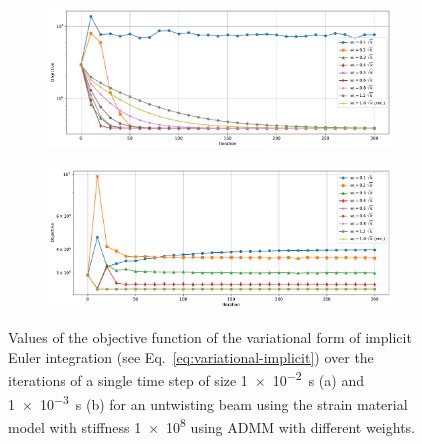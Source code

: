 \begin{figure}[h]
    \centering
    \begin{subfigure}{\textwidth}
        \includegraphics[width=\linewidth]{figures/strain_admm_weights_1e-2.pdf}
    \end{subfigure}
    \begin{subfigure}{\textwidth}
        \includegraphics[width=\linewidth]{figures/strain_admm_weights_1e-3.pdf}
    \end{subfigure}
    \caption{Values of the objective function of the variational form of implicit Euler integration (see Eq.\ \ref{eq:variational-implicit}) over the iterations of a 
        single time step of size \SI{1e-2}{\second} (a) and \SI{1e-3}{\second} (b) for an untwisting beam using the strain material model with stiffness \num{1e8} 
        using ADMM with different weights.}
    \label{fig:strain-weights-admm}
\end{figure}

